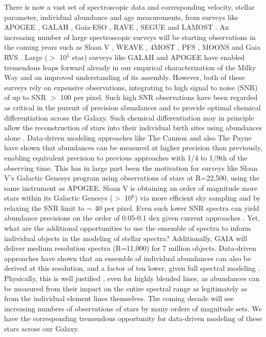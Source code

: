 \documentclass[a4paper,fleqn,usenatbib]{mnras}
\begin{document}
There is now a vast set of spectroscopic data and corresponding velocity, stellar parameter, individual abundance and age measurements, from surveys like APOGEE \citep{Majewski2017}, GALAH \citep{deSilva2015}, Gaia-ESO \citep{Gilmore2012}, RAVE \citep{Steinmetz2006}, SEGUE \citep{Yanny2009} and LAMOST \citep{Newberg2012}. An increasing number of large spectroscopic surveys will be starting observations in the coming years such as Sloan V \citep{Kollmeier2017}, WEAVE \citep{Bonifacio2016}, 4MOST \citep{deJong2019}, PFS \citep{PFS2018}, MOONS \citep{C2014} and Gaia RVS \citep{Gaia2016}. Large ($>$ 10$^5$ star) surveys like GALAH and APOGEE have enabled tremendous leaps forward already in our empirical characterization of the Milky Way and an improved understanding of its assembly. However, both of these surveys rely on expensive observations, integrating to high signal to noise (SNR) of up to SNR $>$ 100 per pixel. Such high SNR observations have been regarded as critical in the pursuit of precision abundances and to provide optimal chemical differentiation across the Galaxy. Such chemical differentiation may in principle allow the reconstruction of stars into their individual birth sites using abundances alone \citep[e.g.][]{BH2010}. Data-driven modeling approaches like The Cannon \citep{Ness2015} and also The Payne \citep{Ting2017} have shown that abundances can be measured at higher precision than previously, enabling equivalent precision to previous approaches with 1/4 to 1/9th of the observing time. This has in large part been the motivation for surveys like Sloan V's Galactic Genesys program using observations of stars at R=22,500, using the same instrument as APOGEE. Sloan V is obtaining an order of magnitude more stars within its Galactic Genesys  ($>$ 10$^6$) via more efficient sky sampling and by relaxing the SNR limit to $\sim$ 40 per pixel. Even such lower SNR spectra can yield  abundance precisions on the order of 0.05-0.1 dex given current approaches \citep{Ness2015, Ting2015}. Yet, what are the additional opportunities to use the ensemble of spectra to inform individual objects in the modeling of stellar spectra? Additionally, GAIA will deliver medium resolution spectra (R=11,000) for 7 million objects. Data-driven approaches have shown that an ensemble of individual abundances can also be derived at this resolution, and a factor of ten lower, given full spectral modeling \citep[e.g.][and Wheeler et al., in prep]{Casey2016, Ting2017}. Physically, this is well justified  \citep{Ting2018}, even for highly blended lines, as abundances can be measured from their impact on the entire spectral range as legitimately as from the individual element lines themselves. The coming decade will see increasing numbers of observations of stars by many orders of magnitude sets. We have the corresponding tremendous opportunity for data-driven modeling of these stars across our Galaxy. 
\end{document}
